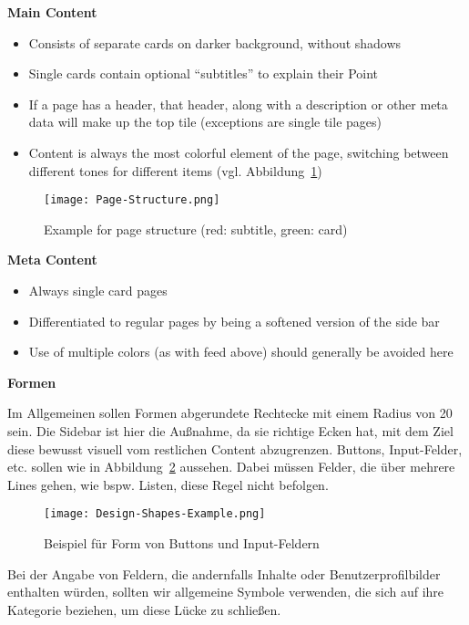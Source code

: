 \textbf{Main Content}
\begin{itemize}
    \item Consists of separate cards on darker background, without shadows
    \item Single cards contain optional “subtitles” to explain their Point
    \item If a page has a header, that header, along with a description or other meta data will make up the top tile (exceptions are single tile pages)
    \item Content is always the most colorful element of the page, switching between different tones for different items (vgl. Abbildung~\ref{fig:Page-Structure-Example})
\end{itemize}

\begin{figure}
    \texttt{[image: Page-Structure.png]}
    \caption{Example for page structure (red: subtitle, green: card)}
    \label{fig:Page-Structure-Example}
\end{figure}

\textbf{Meta Content}
\begin{itemize}
    \item Always single card pages
    \item Differentiated  to regular pages by being a softened version of the side bar
    \item Use of multiple colors (as with feed above) should generally be avoided here
\end{itemize}
 
\textbf{Formen}

Im Allgemeinen sollen Formen abgerundete Rechtecke mit einem Radius von 20 sein. Die Sidebar ist hier die Außnahme, da sie richtige Ecken hat, 
mit dem Ziel diese bewusst visuell vom restlichen Content abzugrenzen.
Buttons, Input-Felder, etc. sollen wie in Abbildung~\ref{fig:Design-Shapes-Example} aussehen. 
Dabei müssen Felder, die über mehrere Lines gehen, wie bspw. Listen, diese Regel nicht befolgen.

\begin{figure}[H]
    \texttt{[image: Design-Shapes-Example.png]}
    \caption{Beispiel für Form von Buttons und Input-Feldern}
    \label{fig:Design-Shapes-Example}
\end{figure}

Bei der Angabe von Feldern, die andernfalls Inhalte oder Benutzerprofilbilder enthalten würden,
sollten wir allgemeine Symbole verwenden, die sich auf ihre Kategorie beziehen, um diese Lücke zu schließen.

